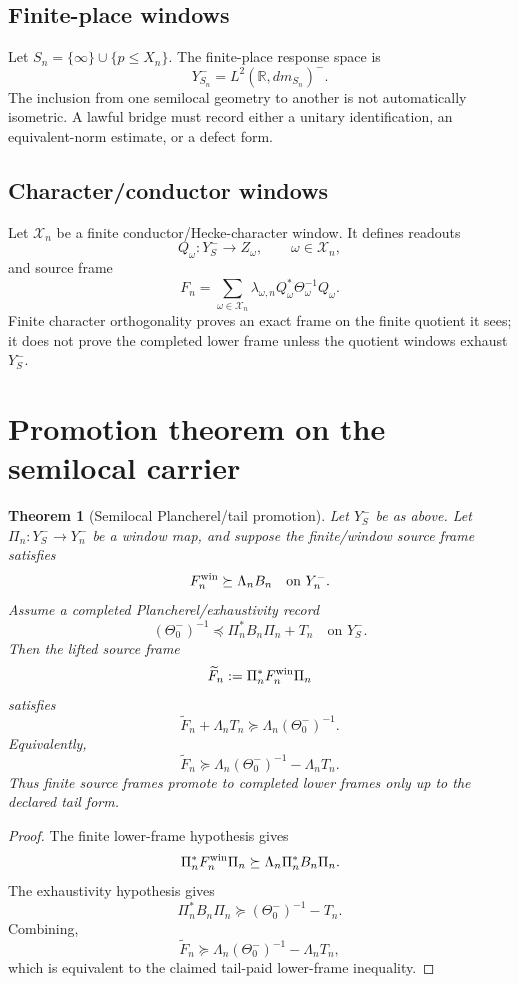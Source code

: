 \documentclass[11pt]{article}
\newtheorem{theorem}{Theorem}
\newcommand{\R}{\mathbb R}
\begin{document}
\subsection{Finite-place windows}
Let \(S_n=\{\infty\}\cup\{p\le X_n\}\). The finite-place response space is
\[
Y_{S_n}^-=L^2(\R,dm_{S_n})^-.
\]
The inclusion from one semilocal geometry to another is not automatically isometric. A lawful bridge must record either a unitary identification, an equivalent-norm estimate, or a defect form.

\subsection{Character/conductor windows}
Let \(\mathcal X_n\) be a finite conductor/Hecke-character window. It defines readouts
\[
Q_\omega:Y_S^-\to Z_\omega,
\qquad \omega\in\mathcal X_n,
\]
and source frame
\[
F_n=\sum_{\omega\in\mathcal X_n}\lambda_{\omega,n}Q_\omega^*\Theta_\omega^{-1}Q_\omega.
\]
Finite character orthogonality proves an exact frame on the finite quotient it sees; it does not prove the completed lower frame unless the quotient windows exhaust \(Y_S^-\).

\section{Promotion theorem on the semilocal carrier}
\begin{theorem}[Semilocal Plancherel/tail promotion]
Let \(Y_S^-\) be as above. Let \(\Pi_n:Y_S^-\to Y_n^-\) be a window map, and suppose the finite/window source frame satisfies
\[
F_n^{\rm win}\succeq \Lambda_n B_n
\quad\text{on }Y_n^-.
\]
Assume a completed Plancherel/exhaustivity record
\[
(\Theta_0^-)^{-1}\preceq \Pi_n^*B_n\Pi_n+T_n
\quad\text{on }Y_S^-.
\]
Then the lifted source frame
\[
\widetilde F_n:=\Pi_n^*F_n^{\rm win}\Pi_n
\]
satisfies
\[
\widetilde F_n+\Lambda_nT_n\succeq \Lambda_n(\Theta_0^-)^{-1}.
\]
Equivalently,
\[
\widetilde F_n\succeq\Lambda_n(\Theta_0^-)^{-1}-\Lambda_nT_n.
\]
Thus finite source frames promote to completed lower frames only up to the declared tail form.
\end{theorem}

\begin{proof}
The finite lower-frame hypothesis gives
\[
\Pi_n^*F_n^{\rm win}\Pi_n\succeq \Lambda_n\Pi_n^*B_n\Pi_n.
\]
The exhaustivity hypothesis gives
\[
\Pi_n^*B_n\Pi_n\succeq (\Theta_0^-)^{-1}-T_n.
\]
Combining,
\[
\widetilde F_n\succeq \Lambda_n(\Theta_0^-)^{-1}-\Lambda_nT_n,
\]
which is equivalent to the claimed tail-paid lower-frame inequality.
\end{proof}
\end{document}
